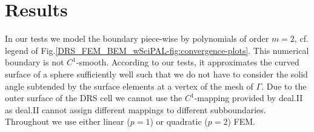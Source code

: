 \documentclass[runningheads]{lncse}
\newcommand{\mydiff}[2]{{}{#2}}
\begin{document}
\section{Results}
\label{DRS_FEM_BEM_wSciPAL-sec:drs-fem-bem-results}
%
\mydiff{In our tests we model the boundary piece-wise quadratically, $m=2$, which although not $C^1$-smooth, approximates the curved surface of a sphere sufficiently well. Hence, we do not have to care about}
{In our tests we model the boundary piece-wise by polynomials of order $m=2$, 
cf. legend of Fig.\ref{DRS_FEM_BEM_wSciPAL-fig:convergence-plots}. 
%
This numerical boundary is not $C^1$-smooth. 
According to our tests, it approximates the curved surface of a sphere sufficiently well such that we do not have to consider}
%
the solid angle subtended by the surface elements at a vertex of the mesh of $\Gamma$.  
%
%
Due to 
 the outer surface of the DRS cell we cannot use the
 $C^1$-mapping provided by deal.II
 as deal.II cannot assign different mappings to \mydiff{}{different} subboundaries. 
 Throughout we use either linear ($p=1$) or quadratic ($p=2$) FEM.
 
\end{document}
